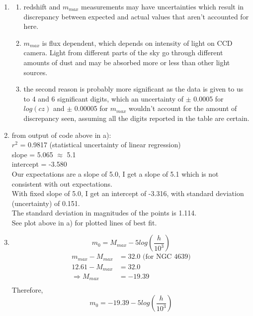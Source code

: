 \documentclass[10pt,letterpaper]{article}
\begin{document}
\begin{enumerate}
\begin{enumerate}
\item
\begin{enumerate}
\item redshift and $m_{max}$ measurements may have uncertainties which result in discrepancy between expected and actual values that aren't accounted for here.\\
\item $m_{max}$ is flux dependent, which depends on intensity of light on CCD camera. Light from different parts of the sky go through different amounts of dust and may be absorbed more or less than other light sources.\\
\item the second reason is probably more significant as the data is given to us to 4 and 6 significant digits, which an uncertainty of $\pm$ 0.0005 for $log(cz)$ and $\pm$ 0.00005 for $m_{max}$ wouldn't account for the amount of discrepancy seen, assuming all the digits reported in the table are certain.\\
\end{enumerate}

\item from output of code above in a):\\

$r^2$ = 0.9817 (statistical uncertainty of linear regression)\\
slope = 5.065 $\approx$ 5.1\\
intercept = -3.580\\

Our expectations are a slope of 5.0, I get a slope of 5.1 which is not consistent with out expectations.\\

With fixed slope of 5.0, I get an intercept of -3.316, with standard deviation (uncertainty) of 0.151.\\

The standard deviation in magnitudes of the points is 1.114.\\

See plot above in a) for plotted lines of best fit.\\

\item \begin{equation}\nonumber
m_0 = M_{max} - 5 log \left(\frac{h}{10^3}\right)
\end{equation}
\begin{equation}\nonumber
\begin{split}
m_{max} - M_{max} & = 32.0 \text{ (for NGC 4639)}\\
12.61 - M_{max} & = 32.0\\
\Rightarrow M_{max} & = -19.39\\
\end{split}
\end{equation}
Therefore, 
\begin{equation}\nonumber
m_0 = -19.39 - 5 log\left(\frac{h}{10^3}\right)
\end{equation}


\end{enumerate}
\end{enumerate}
\end{document}
